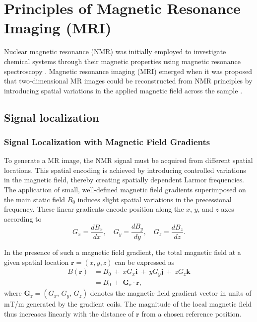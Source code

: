 \section{Principles of Magnetic Resonance Imaging (MRI)}

    

Nuclear magnetic resonance (NMR) was initially employed to investigate chemical systems through their magnetic properties using magnetic resonance spectroscopy \citep{ernstApplicationFourierTransform1966}. Magnetic resonance imaging (MRI) emerged when it was proposed that two-dimensional MR images could be reconstructed from NMR principles by introducing spatial variations in the applied magnetic field across the sample \citep{mansfieldNMRDiffractionSolids1973, lauterburImageFormationInduced1973, haydenHistoryPhysicalPrinciples2016}.

\subsection{Signal localization}
\label{sec:signal}

\subsubsection{Signal Localization with Magnetic Field Gradients}

To generate a MR image, the NMR signal must be acquired from different spatial locations. This spatial encoding is achieved by introducing controlled variations in the magnetic field, thereby creating spatially dependent Larmor frequencies. The application of small, well-defined magnetic field gradients superimposed on the main static field $B_0$ induces slight spatial variations in the precessional frequency. These linear gradients encode position along the $x$, $y$, and $z$ axes according to
\begin{equation}
    G_x = \frac{dB_x}{dx}, \quad
    G_y = \frac{dB_y}{dy}, \quad
    G_z = \frac{dB_z}{dz}.
\end{equation}

In the presence of such a magnetic field gradient, the total magnetic field at a given spatial location $\mathbf{r} = (x, y, z)$ can be expressed as
\begin{equation}
\begin{aligned}
    B(\mathbf{r})
    &= B_0 \ + \ xG_x \mathbf{i} \ + \ yG_y \mathbf{j} \ + \ zG_z \mathbf{k} \\
    &= B_0 \ + \ \mathbf{G_r} \cdot \mathbf{r},
\end{aligned}
\end{equation}
where $\mathbf{G_r} = (G_x,\, G_y,\, G_z)$ denotes the magnetic field gradient vector in units of mT/m generated by the gradient coils. The magnitude of the local magnetic field thus increases linearly with the distance of $\mathbf{r}$ from a chosen reference position.

